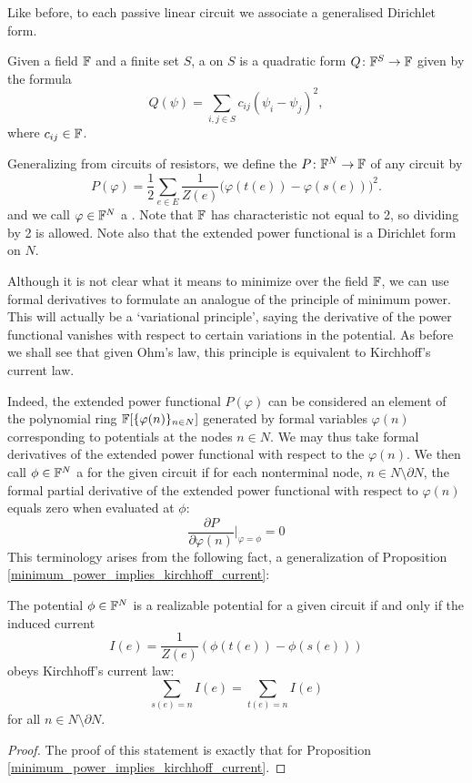 Like before, to each passive linear circuit we associate a generalised Dirichlet
form.

\begin{definition} Given a field ${\mathbb F}$ and
  a finite set $S$, a  on $S$ is a quadratic form   
  $Q{\colon} {\mathbb F}^S \to {\mathbb F}$ given by the formula 
  \[ 
    Q(\psi) = \sum_{i,j \in S} c_{ij} (\psi_i - \psi_j)^2,
  \]
  where $c_{i j} \in {\mathbb F}$.  
\end{definition}

Generalizing from circuits of resistors, we define the
 $P{\colon} {\mathbb F}^N \to {\mathbb F}$ of any circuit by
\[
  P(\varphi) = \frac{1}{2} \sum_{e \in E}
  \frac1{Z(e)}\big(\varphi(t(e))-\varphi(s(e))\big)^2.
\]
and we call $\varphi \in {\mathbb F}^N$ a . Note that ${\mathbb F}$ has
characteristic not equal to 2, so dividing by 2 is allowed.  Note also that the
extended power functional is a Dirichlet form on $N$.

Although it is not clear what it means to minimize over the field ${\mathbb F}$, we can
use formal derivatives to formulate an analogue of the principle of minimum 
power.   This will actually be a `variational principle', saying the derivative of
the power functional vanishes with respect to certain variations in the potential.
As before we shall see that given Ohm's law, this principle is equivalent to
Kirchhoff's current law.

Indeed, the extended power functional $P(\varphi)$ can be considered an element
of the polynomial ring ${\mathbb F}[\{\varphi(n)\}_{n \in N}]$ generated by formal
variables $\varphi(n)$ corresponding to potentials at the nodes $n \in N$. We
may thus take formal derivatives of the extended power functional with respect
to the $\varphi(n)$.  We then call $\phi \in {\mathbb F}^N$ a  for the given circuit if for each nonterminal node, $n \in N\setminus
\partial N$, the formal partial derivative of the extended power functional with
respect to $\varphi(n)$ equals zero when evaluated at $\phi$:
\[
  \frac{\partial P}{\partial \varphi(n)}\bigg\vert_{\varphi = \phi} = 0
\]
This terminology arises from the following fact, a generalization of Proposition
\ref{minimum_power_implies_kirchhoff_current}:

\begin{theorem} \label{thm:realizablepotentials}
The potential $\phi \in {\mathbb F}^N$ is a realizable potential for a given
circuit if and only if the induced current 
\[  I(e) = \frac1{Z(e)}(\phi(t(e))-\phi(s(e))) \]
obeys Kirchhoff's current law:
\[ 
\sum_{s(e) = n} I(e) = \sum_{t(e) = n} I(e)
\]  
for all $n \in N\setminus \partial N$.
\end{theorem}
\begin{proof}
The proof of this statement is exactly that for Proposition
\ref{minimum_power_implies_kirchhoff_current}. 
\end{proof}

